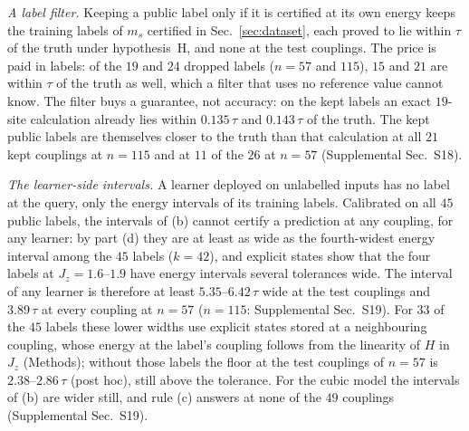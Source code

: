 \documentclass[aps,prx,twocolumn,10pt,superscriptaddress,nofootinbib,longbibliography,floatfix]{revtex4-2}
\theoremstyle{remark}
\newcommand{\Jz}{J_z}
\newcommand{\ms}{m_s}
\begin{document}
\emph{A label filter.} Keeping a public label only if it is certified at its own energy keeps the training labels
of $\ms$ certified in Sec.~\ref{sec:dataset}, each proved to lie within $\tau$ of the truth under hypothesis~H, and
none at the test couplings. The price is paid in labels: of the $19$ and $24$ dropped labels ($n=57$ and $115$), %
$15$ and $21$ are within $\tau$ of the truth as well, which a filter that uses no reference value cannot %
know. The filter buys a guarantee, not accuracy: on the kept labels an exact $19$-site calculation already lies
within $0.135\,\tau$ and $0.143\,\tau$ of the truth. %
The kept public labels are themselves closer to the truth than that calculation at all $21$ kept couplings at $n=115$ %
and at $11$ of the $26$ at $n=57$ (Supplemental Sec.~S18). %

\emph{The learner-side intervals.} A learner deployed on unlabelled inputs has no label at the query, only the energy
intervals of its training labels. Calibrated on all $45$ public labels, the intervals of (b) cannot certify a
prediction at any coupling, for any learner: by part (d) they are at least as wide as the fourth-widest energy
interval among the $45$ labels ($k=42$), and explicit states show that the four labels at $\Jz=1.6$--$1.9$ have %
energy intervals several tolerances wide. The interval of any learner is therefore at least $5.35$--$6.42\,\tau$ %
wide at the test couplings and $3.89\,\tau$ at every coupling at $n=57$ ($n=115$: Supplemental Sec.~S19). %
For $33$ of the $45$ labels these lower widths use explicit states stored at a neighbouring coupling, %
whose energy at the label's coupling follows from the linearity of $H$ in $\Jz$ (Methods); without those labels the
floor at the test couplings of $n=57$ is $2.38$--$2.86\,\tau$ (post hoc), still above the tolerance. For the cubic %
model the intervals of (b) are wider still, and rule (c) answers at none of the $49$ couplings (Supplemental Sec.~S19). %
\end{document}

